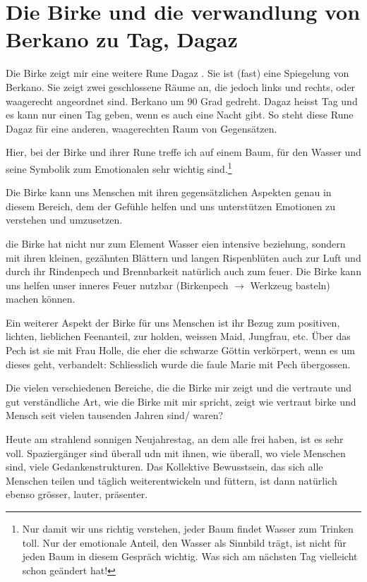 \documentclass[11pt,titlepage,a5paper]{book}
\begin{document}
\section{Die Birke und die verwandlung von Berkano  zu Tag, Dagaz  }

Die Birke zeigt mir eine weitere Rune Dagaz .
Sie ist (fast) eine Spiegelung von Berkano. Sie zeigt zwei geschlossene Räume an, die jedoch links und rechts, oder waagerecht angeordnet sind. Berkano um 90 Grad gedreht. Dagaz heisst Tag und es kann nur einen Tag geben, wenn es auch eine Nacht gibt. So steht diese Rune Dagaz für eine anderen, waagerechten Raum von Gegensätzen.

Hier, bei der Birke und ihrer Rune treffe ich auf einem Baum, für den Wasser und seine Symbolik zum Emotionalen sehr wichtig sind.\footnote{Nur damit wir uns richtig verstehen, jeder Baum findet Wasser zum Trinken toll. Nur der emotionale Anteil, den Wasser als Sinnbild trägt, ist nicht für jeden Baum in diesem Gespräch wichtig. Was sich am nächsten Tag vielleicht schon geändert hat!}

Die Birke kann uns Menschen mit ihren gegensätzlichen Aspekten genau in diesem Bereich, dem der Gefühle helfen und uns unterstützen Emotionen zu verstehen und umzusetzen.

die Birke hat nicht nur zum Element Wasser eien intensive beziehung, sondern mit ihren kleinen, gezähnten Blättern und langen Rispenblüten auch zur Luft und durch ihr Rindenpech und Brennbarkeit natürlich auch zum feuer. Die Birke kann uns helfen unser inneres Feuer nutzbar (Birkenpech $\rightarrow$ Werkzeug basteln) machen können.

Ein weiterer Aspekt der Birke für uns Menschen ist ihr Bezug zum positiven, lichten, lieblichen Feenanteil, zur holden, weissen Maid, Jungfrau, etc. Über das Pech ist sie mit Frau Holle, die eher die schwarze Göttin verkörpert, wenn es um dieses geht, verbandelt: Schliesslich wurde die faule Marie mit Pech übergossen.

 Die vielen verschiedenen Bereiche, die die Birke mir zeigt und die vertraute und gut verständliche Art, wie die Birke mit mir spricht, zeigt wie vertraut birke und Mensch seit vielen tausenden Jahren sind/ waren?
 
Heute am strahlend sonnigen Neujahrestag, an dem alle frei haben, ist es sehr voll. Spaziergänger sind überall udn mit ihnen, wie überall, wo viele Menschen sind, viele Gedankenstrukturen. Das Kollektive Bewusstsein, das sich alle Menschen teilen und täglich weiterentwickeln und füttern, ist dann natürlich ebenso grösser, lauter, präsenter.
\end{document}
